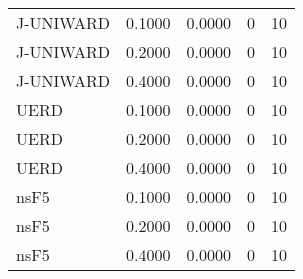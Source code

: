 \begin{tabular}{lrrrr}
\toprule
\midrule
J-UNIWARD & 0.1000 & 0.0000 & 0 & 10 \\
J-UNIWARD & 0.2000 & 0.0000 & 0 & 10 \\
J-UNIWARD & 0.4000 & 0.0000 & 0 & 10 \\
UERD & 0.1000 & 0.0000 & 0 & 10 \\
UERD & 0.2000 & 0.0000 & 0 & 10 \\
UERD & 0.4000 & 0.0000 & 0 & 10 \\
nsF5 & 0.1000 & 0.0000 & 0 & 10 \\
nsF5 & 0.2000 & 0.0000 & 0 & 10 \\
nsF5 & 0.4000 & 0.0000 & 0 & 10 \\
\bottomrule
\end{tabular}
